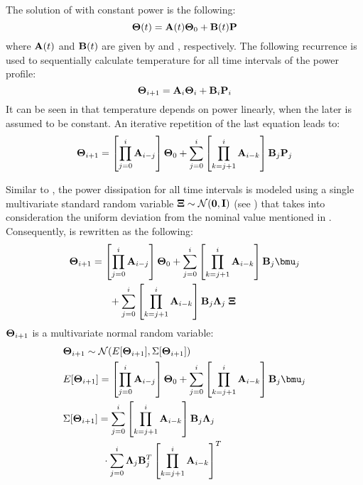 The solution of  with constant power is the following:
\[
  \mathbf{\Theta}(t) = \mathbf{A}(t) \mathbf{\Theta}_0 + \mathbf{B}(t) \mathbf{P}
\]
where $\mathbf{A}(t)$ and $\mathbf{B}(t)$ are given by  and , respectively. The following recurrence is used to sequentially calculate temperature for all time intervals of the power profile:
\begin{equation} \equlabel{fourier-recurrence}
  \vtemperature_{i + 1} = \m{A}_i \vtemperature_i + \m{B}_i \vpower_i
\end{equation}
It can be seen in  that temperature depends on power linearly, when the later is assumed to be constant. An iterative repetition of the last equation leads to:
\begin{equation} \equlabel{fourier-unfold-recurrence}
  \vtemperature_{i + 1} = \left[ \prod_{j = 0}^{i} \m{A}_{i - j} \right] \vtemperature_0 + \sum_{j = 0}^{i} \left[ \prod_{k = j + 1}^{i} \m{A}_{i - k} \right] \m{B}_j \vpower_j
\end{equation}

Similar to , the power dissipation for all time intervals is modeled using a single multivariate standard random variable $\mathbf{\Xi} \sim \mathcal{N}(\mathbf{0}, \mathbf{I})$ (see ) that takes into consideration the uniform deviation from the nominal value mentioned in . Consequently,  is rewritten as the following:
\begin{align}
  & \vtemperature_{i + 1} = \left[ \prod_{j = 0}^{i} \m{A}_{i - j} \right] \vtemperature_0 + \sum_{j = 0}^{i} \left[ \prod_{k = j + 1}^{i} \m{A}_{i - k} \right] \m{B}_j \vmean{j} \nonumber \\
  & {} \qquad \qquad + \sum_{j = 0}^{i} \left[ \prod_{k = j + 1}^{i} \m{A}_{i - k} \right] \m{B}_j \ddeviation{j} \; \vnoise \equlabel{fourier-unfold-recurrence-rv}
\end{align}
$\mathbf{\Theta}_{i + 1}$ is a multivariate normal random variable:
\begin{align*}
  & \vtemperature_{i + 1} \sim \normal(\expectation{\vtemperature_{i + 1}}, \covariance{\vtemperature_{i + 1}}) \\
  & \expectation{\vtemperature_{i + 1}} = \left[ \prod_{j = 0}^{i} \m{A}_{i - j} \right] \vtemperature_0 + \sum_{j = 0}^{i} \left[ \prod_{k = j + 1}^{i} \m{A}_{i - k} \right] \m{B}_j \vmean{j} \\
  & \covariance{\vtemperature_{i + 1}} = \sum_{j = 0}^{i} \left[ \prod_{k = j + 1}^{i} \m{A}_{i - k} \right] \m{B}_j \ddeviation{j} \\
  & {} \qquad \qquad \cdot \sum_{j = 0}^{i} \ddeviation{j} \m{B}_j^T \left[ \prod_{k = j + 1}^{i} \m{A}_{i - k} \right]^T
\end{align*}
